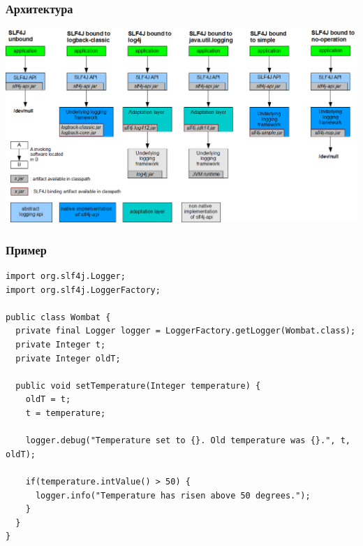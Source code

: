 \documentclass[xetex,mathserif,serif]{beamer}
\begin{document}
	\begin{frame}
		\frametitle{Архитектура}
		\begin{center}
			\includegraphics[width=\textwidth]{slf4jBindings.png}
		\end{center}
	\end{frame}

	\begin{frame}[fragile]
		\frametitle{Пример}
		\begin{footnotesize}
			\begin{verbatim}
import org.slf4j.Logger;
import org.slf4j.LoggerFactory;

public class Wombat {
  private final Logger logger = LoggerFactory.getLogger(Wombat.class);
  private Integer t;
  private Integer oldT;

  public void setTemperature(Integer temperature) {
    oldT = t;
    t = temperature;

    logger.debug("Temperature set to {}. Old temperature was {}.", t, oldT);

    if(temperature.intValue() > 50) {
      logger.info("Temperature has risen above 50 degrees.");
    }
  }
} 
			\end{verbatim}
		\end{footnotesize}
\end{frame}
\end{document}
